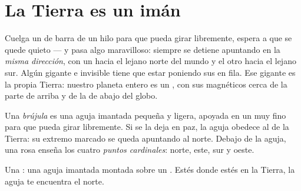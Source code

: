 \section{La Tierra es un imán}

\begin{example}\label{ex:g4:magnets-and-compass:earth}
Cuelga un  de barra de un hilo para que pueda girar libremente,
espera a que se quede quieto --- y pasa algo maravilloso: siempre se
detiene apuntando en la \emph{misma dirección}, con un  hacia el
lejano norte del mundo y el otro hacia el lejano sur. Algún 
gigante e invisible tiene que estar poniendo sus  en fila. Ese
gigante es la propia Tierra: nuestro planeta entero es un , con
sus  magnéticos cerca de la parte de arriba y de la de abajo del
globo.
\end{example}

\begin{definition}[La brújula]\label{def:g4:magnets-and-compass:compass}
Una \emph{brújula} es una aguja imantada pequeña y
ligera, apoyada en un  muy fino para que pueda girar
libremente. Si se la deja en paz, la aguja obedece al  de la
Tierra: su extremo marcado se queda apuntando al norte. Debajo de la
aguja, una rosa enseña los cuatro \emph{puntos cardinales}: norte, este, sur y oeste.
\end{definition}

\begin{omfigure}

{\small Una : una aguja imantada montada sobre un
. Estés donde estés en la Tierra, la aguja te encuentra
el norte.}
\end{omfigure}

